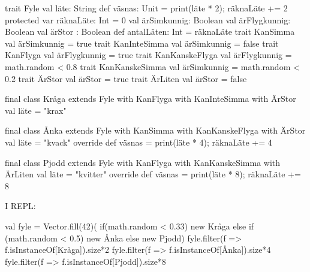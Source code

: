 \begin{Code}
trait Fyle {
  val läte: String
  def väsnas: Unit = { print(läte * 2); räknaLäte += 2 }
  protected var räknaLäte: Int = 0
  val ärSimkunnig: Boolean
  val ärFlygkunnig: Boolean
  val ärStor : Boolean
  def antalLäten: Int = räknaLäte
}
trait KanSimma { val ärSimkunnig = true }
trait KanInteSimma { val ärSimkunnig = false }
trait KanFlyga { val ärFlygkunnig = true }
trait KanKanskeFlyga { val ärFlygkunnig = math.random < 0.8 }
trait KanKanskeSimma { val ärSimkunnig = math.random < 0.2 }
trait ÄrStor { val ärStor = true }
trait ÄrLiten { val ärStor = false }

final class Kråga 
  extends Fyle 
  with KanFlyga 
  with KanInteSimma 
  with ÄrStor{
  val läte = "krax"
}

final class Ånka 
  extends Fyle 
  with KanSimma 
  with KanKanskeFlyga 
  with ÄrStor{
  val läte = "kvack"
  override def väsnas = { print(läte * 4); räknaLäte += 4 }
}

final class Pjodd 
  extends Fyle 
  with KanFlyga 
  with KanKanskeSimma 
  with ÄrLiten{
  val läte = "kvitter"
  override def väsnas = { print(läte * 8); räknaLäte += 8 }
}
\end{Code}

I REPL: 
\begin{REPL}
val fyle = Vector.fill(42)(
  if(math.random < 0.33) new Kråga else 
  if (math.random < 0.5) new Ånka else 
  new Pjodd)
fyle.filter(f => f.isInstanceOf[Kråga]).size*2
fyle.filter(f => f.isInstanceOf[Ånka]).size*4
fyle.filter(f => f.isInstanceOf[Pjodd]).size*8
\end{REPL}

\AdvancedTasks %
